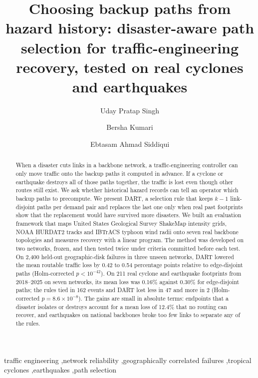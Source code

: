\documentclass[preprint,12pt]{elsarticle}
\begin{document}
\begin{frontmatter}

\title{Choosing backup paths from hazard history: disaster-aware path selection for traffic-engineering recovery, tested on real cyclones and earthquakes}

\author[aids]{Uday Pratap Singh}
\author[ce]{Bersha Kumari}
\author[ce]{Ebtasam Ahmad Siddiqui}

\begin{abstract}
When a disaster cuts links in a backbone network, a traffic-engineering controller can only move traffic onto the backup paths it computed in advance. If a cyclone or earthquake destroys all of those paths together, the traffic is lost even though other routes still exist. We ask whether historical hazard records can tell an operator which backup paths to precompute. We present DART, a selection rule that keeps $k-1$ link-disjoint paths per demand pair and replaces the last one only when real past footprints show that the replacement would have survived more disasters. We built an evaluation framework that maps United States Geological Survey ShakeMap intensity grids, NOAA HURDAT2 tracks and IBTrACS typhoon wind radii onto seven real backbone topologies and measures recovery with a linear program. The method was developed on two networks, frozen, and then tested twice under criteria committed before each test. On 2{,}400 held-out geographic-disk failures in three unseen networks, DART lowered the mean routable traffic loss by 0.42 to 0.54 percentage points relative to edge-disjoint paths (Holm-corrected $p<10^{-42}$). On 211 real cyclone and earthquake footprints from 2018--2025 on seven networks, its mean loss was 0.16\% against 0.30\% for edge-disjoint paths; the rules tied in 162 events and DART lost less in 47 and more in 2 (Holm-corrected $p=8.6\times10^{-8}$). The gains are small in absolute terms: endpoints that a disaster isolates or destroys account for a mean loss of 12.4\% that no routing can recover, and earthquakes on national backbones broke too few links to separate any of the rules.
\end{abstract}

\begin{keyword}
traffic engineering \sep network reliability \sep geographically correlated failures \sep tropical cyclones \sep earthquakes \sep path selection
\end{keyword}

\end{frontmatter}
\end{document}
